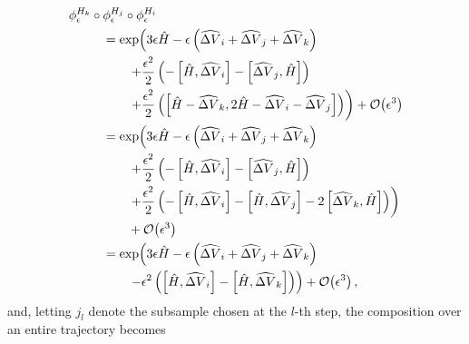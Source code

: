 \documentclass{article}
\begin{document}
\begin{align*}
\phi^{H_{k}}_{\epsilon} \circ \phi^{H_{j}}_{\epsilon} \circ \phi^{H_{i}}_{\epsilon}
&
\\
& \hspace{-15mm} =
\exp \! \left( 
3 \epsilon \hat{H} 
- \epsilon \left( \widehat{ \Delta V}_{i} +  \widehat{ \Delta V}_{j} +  \widehat{ \Delta V}_{k} \right)
\right.
\\
& \hspace{-8mm} \left.
+ \frac{\epsilon^{2}}{2} \left(
- \left[ \hat{H}, \widehat{ \Delta V}_{i} \right]
- \left[ \widehat{ \Delta V}_{j}, \hat{H} \right] \right) \right.
\\
& \hspace{-8mm} \left.
+ \frac{\epsilon^{2}}{2} \left(
\left[ \hat{H} - \widehat{ \Delta V}_{k}, 2 \hat{H} - \widehat{ \Delta V}_{i} - \widehat{ \Delta V}_{j} \right]
\right)
\right)
+ \mathcal{O} \! \left( \epsilon^{3} \right)
\\
& \hspace{-15mm} =
\exp \! \left( 
3 \epsilon \hat{H} 
- \epsilon \left( \widehat{ \Delta V}_{i} + \widehat{ \Delta V}_{j} + \widehat{ \Delta V}_{k} \right)
\right.
\\
& \hspace{-8mm} \left.
+ \frac{\epsilon^{2}}{2} \left(
- \left[ \hat{H}, \widehat{ \Delta V}_{i} \right]
- \left[ \widehat{ \Delta V}_{j}, \hat{H} \right] \right) \right.
\\
& \hspace{-8mm} \left.
+ \frac{\epsilon^{2}}{2} \left(
- \left[ \hat{H}, \widehat{ \Delta V}_{i} \right]
- \left[ \hat{H}, \widehat{ \Delta V}_{j} \right]
- 2 \left[ \widehat{ \Delta V}_{k}, \hat{H} \right] \right) \right)
\\
& \hspace{-8mm}
+ \mathcal{O} \! \left( \epsilon^{3} \right)
\\
& \hspace{-15mm} =
\exp \! \left( 
3 \epsilon \hat{H} 
- \epsilon \left( \widehat{ \Delta V}_{i} + \widehat{ \Delta V}_{j} + \widehat{ \Delta V}_{k} \right)
\right.
\\
& \hspace{-8mm} \left.
- \epsilon^{2} \left( \left[ \hat{H}, \widehat{ \Delta V}_{i} \right] 
- \left[ \hat{H}, \widehat{ \Delta V}_{k} \right] \right)
\right) + \mathcal{O} \! \left( \epsilon^{3} \right),
\end{align*}
%
and, letting $j_{l}$ denote the subsample chosen at the $l$-th step, the composition over
an entire trajectory becomes
\end{document}
